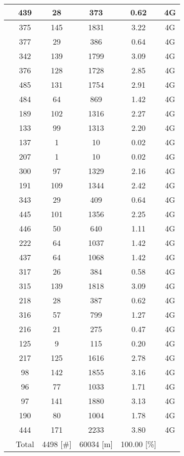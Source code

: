 \begin{longtable*}{|c|c|c|c|c|c|}
 &439&28&373&0.62&4G\\\hline
{} &375&145&1831&3.22&4G\\\hline
{} &377&29&386&0.64&4G\\\hline
{} &342&139&1799&3.09&4G\\\hline
{} &376&128&1728&2.85&4G\\\hline
{} &485&131&1754&2.91&4G\\\hline
{} &484&64&869&1.42&4G\\\hline
{} &189&102&1316&2.27&4G\\\hline
{} &133&99&1313&2.20&4G\\\hline
{} &137&1&10&0.02&4G\\\hline
{} &207&1&10&0.02&4G\\\hline
{} &300&97&1329&2.16&4G\\\hline
{} &191&109&1344&2.42&4G\\\hline
{} &343&29&409&0.64&4G\\\hline
{} &445&101&1356&2.25&4G\\\hline
{} &446&50&640&1.11&4G\\\hline
{} &222&64&1037&1.42&4G\\\hline
{} &437&64&1068&1.42&4G\\\hline
{} &317&26&384&0.58&4G\\\hline
{} &315&139&1818&3.09&4G\\\hline
{} &218&28&387&0.62&4G\\\hline
{} &316&57&799&1.27&4G\\\hline
{} &216&21&275&0.47&4G\\\hline
{} &125&9&115&0.20&4G\\\hline
{} &217&125&1616&2.78&4G\\\hline
{} &98&142&1855&3.16&4G\\\hline
{} &96&77&1033&1.71&4G\\\hline
{} &97&141&1880&3.13&4G\\\hline
{} &190&80&1004&1.78&4G\\\hline
{} &444&171&2233&3.80&4G\\\hline
{} &Total&4498 [\#]&60034 [m]&100.00 [\%]&\\\hline
\end{longtable*}
